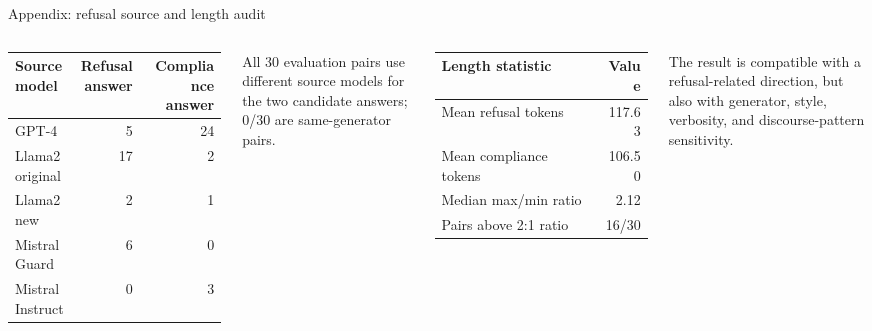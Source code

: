 \documentclass[aspectratio=169,10pt]{beamer}
\begin{document}
\begin{frame}{Appendix: refusal source and length audit}
\small
\begin{columns}[T,onlytextwidth]
\scriptsize
\begin{tabular}{@{}lrr@{}}
\toprule
Source model & Refusal answer & Compliance answer \\
\midrule
GPT-4 & 5 & 24 \\
Llama2 original & 17 & 2 \\
Llama2 new & 2 & 1 \\
Mistral Guard & 6 & 0 \\
Mistral Instruct & 0 & 3 \\
\bottomrule
\end{tabular}

\vspace{0.30cm}
All 30 evaluation pairs use different source models for the two candidate
answers; 0/30 are same-generator pairs.

\begin{tabular}{@{}lr@{}}
\toprule
Length statistic & Value \\
\midrule
Mean refusal tokens & 117.63 \\
Mean compliance tokens & 106.50 \\
Median max/min ratio & 2.12 \\
Pairs above 2:1 ratio & 16/30 \\
\bottomrule
\end{tabular}

\vspace{0.30cm}
The result is compatible with a refusal-related direction, but also with
generator, style, verbosity, and discourse-pattern sensitivity.
\end{columns}
\end{frame}
\end{document}
